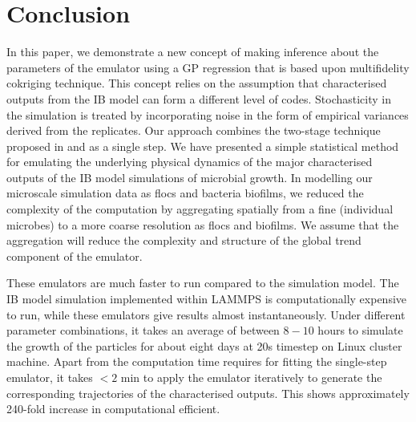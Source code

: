 \section{Conclusion}
In this paper, we demonstrate a new concept of making inference about the parameters of the emulator using a GP regression that is based upon multifidelity cokriging technique. This concept relies on the assumption that characterised outputs from the IB model can form a different level of codes. Stochasticity in the simulation is treated by incorporating noise in the form of empirical variances derived from the replicates. Our approach combines the two-stage technique proposed in \citet{pd11} and \citet{qwole} as a single step. We have presented a simple statistical method for emulating the underlying physical dynamics of the major characterised outputs of the IB model simulations of microbial growth. In modelling our microscale simulation data as flocs and bacteria biofilms, we reduced the complexity of the computation by aggregating spatially from a fine (individual microbes) to a more coarse resolution as flocs and biofilms. We assume that the aggregation will reduce the complexity and structure of the global trend component of the emulator. 

These emulators are much faster to run compared to the simulation model. The IB model simulation implemented within LAMMPS is computationally expensive to run, while these emulators give results almost instantaneously.
Under different parameter combinations, it takes an average of between $8-10$ hours to simulate the growth of the particles for about eight days at 20s timestep on Linux cluster machine. Apart from the computation time requires for fitting the single-step emulator, it takes $<2$ min to apply the emulator iteratively to generate the corresponding trajectories of the characterised outputs. This shows approximately 240-fold increase in computational efficient.

